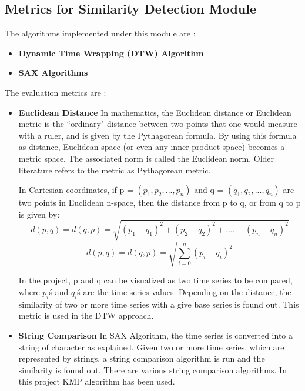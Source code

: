 \documentclass[12pt,a4paper]{report}
\begin{document}
\subsection{Metrics for Similarity Detection Module}
The algorithms implemented under this module are :
\begin{itemize}
\item \textbf{Dynamic Time Wrapping (DTW) Algorithm}
\item \textbf{SAX Algorithms}
\end{itemize}
The evaluation metrics are :
\begin{itemize}
\item \textbf{Euclidean Distance} In mathematics, the Euclidean distance or Euclidean metric is the ``ordinary" distance between two points that one would measure with a ruler, and is given by the Pythagorean formula. By using this formula as distance, Euclidean space (or even any inner product space) becomes a metric space. The associated norm is called the Euclidean norm. Older literature refers to the metric as Pythagorean metric.



In Cartesian coordinates, if p = $(p_1, p_2,..., p_n)$ and q = $(q_1, q_2,..., q_n)$ are two points in Euclidean n-space, then the distance from p to q, or from q to p is given by:
$$d(p,q)=d(q,p)=\sqrt{(p_1-q_1)^2+(p_2-q_2)^2+....+(p_n-q_n)^2} $$
$$d(p,q)=d(q,p)=\sqrt{\sum_{i=0}^{n}{(p_i-q_i)^2}}$$


In the project, p and q can be visualized as two time series to be compared, where $p_i$\'s and $q_i$\'s are the time series values.
Depending on the distance, the similarity of two or more time series with a give base series is found out. This metric is used in the DTW approach.
\item \textbf{String Comparison} In SAX Algorithm, the time series is converted into a string of character as explained. Given two or more time series, which are represented by strings, a string comparison algorithm is run and the similarity is found out. There are various string comparison algorithms. In this project KMP algorithm has been used.
\end{itemize}
\end{document}
